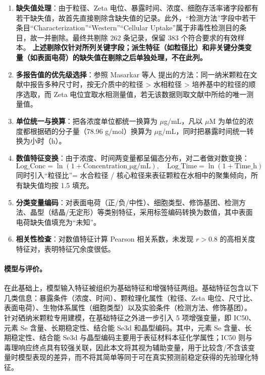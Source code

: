 \begin{enumerate}
  \item \textbf{缺失值处理}：由于粒径、Zeta 电位、暴露时间、浓度、细胞存活率诸字段都有若干缺失值，故首先直接剔除含缺失值的记录。此外，“检测方法”字段中若干条目“Characterization”“Western”“Cellular Uptake”属于非毒性检测目的条目，故一并删除。最终共剔除 262 条记录，保留 383 个符合要求的有效样本。
  \textbf{上述剔除仅针对所列关键字段；派生特征（如粒径比）和非关键分类变量（如表面电荷）的缺失值在剔除之后单独处理，不在此列。}

  \item \textbf{多报告值的优先级选择}：参照 Masarkar 等人 \cite{masarkar2024} 提出的方法：同一纳米颗粒在文献中报告多种尺寸时，按无介质中的粒径 > 水相粒径 > 培养基中的粒径的顺序选取，而 Zeta 电位宜取水相测量值，若无该数据则取文献中所给的唯一测量值。

  \item \textbf{单位统一与换算}：把各浓度单位都统一换算为 $\mu$g/mL，凡以 $\mu$M 为单位的浓度都根据硒的分子量（78.96 g/mol）换算为 $\mu$g/mL，同时把暴露时间统一转换为小时（h）。

  \item \textbf{数值特征变换}：由于浓度、时间两变量都呈偏态分布，对二者做对数变换：
        \[
          \text{Log\_Conc} = \ln(1 + \text{Concentration\_μg/mL}), \quad
          \text{Log\_Time} = \ln(1 + \text{Time\_h})
        \]
        同时引入“粒径比”= 水合粒径 / 核心粒径来表征颗粒在水相中的聚集倾向，所有缺失值均按 1.5 填充。

  \item \textbf{分类变量编码}：对表面电荷（正/负/中性）、细胞类型、修饰基团、检测方法、晶型（结晶/无定形）等类别特征，采用标签编码转换为数值，其中表面电荷缺失值填充为“未知”。

  \item \textbf{相关性检查}：对数值特征计算 Pearson 相关系数，未发现 $r > 0.8$ 的高相关度特征对，表明特征冗余度很低。
\end{enumerate}

\paragraph{模型与评价。}

在此基础上，模型输入特征被组织为基础特征和增强特征两组。基础特征包含以下几类信息：暴露条件（浓度、时间）、颗粒理化属性（粒径、Zeta 电位、尺寸比、表面电荷）、生物体系属性（细胞类型）以及实验条件（检测方法、修饰基团）。
针对硒纳米颗粒专用建模，在基础特征之外进一步引入 5 项增强变量，即 IC50、元素 Se 含量、长期稳定性、结合能 Se3d 和晶型编码。其中，元素 Se 含量、长期稳定性、结合能 Se3d 与晶型编码主要用于表征材料本征化学属性；IC50 则与毒理响应终点具有较强关联，因此本文将其视为辅助变量，用于比较含/不含该变量时模型表现的差异，而不将其简单等同于可在真实预测前稳定获得的先验理化特征。

